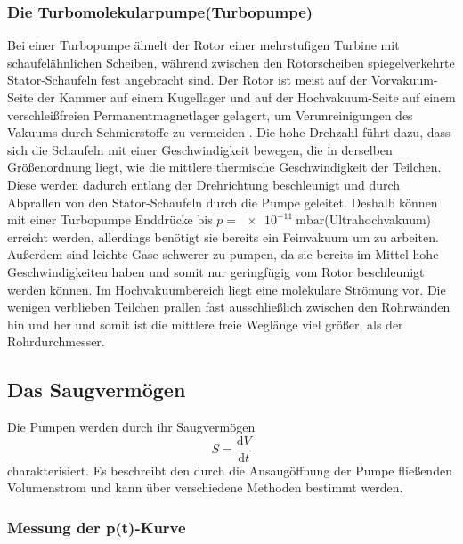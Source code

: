 \subsubsection{Die Turbomolekularpumpe(Turbopumpe)}

Bei einer Turbopumpe ähnelt der Rotor einer mehrstufigen Turbine mit schaufelähnlichen Scheiben, während zwischen den Rotorscheiben spiegelverkehrte Stator-Schaufeln fest angebracht sind.\newline
Der Rotor ist meist auf der Vorvakuum-Seite der Kammer auf einem Kugellager und auf der Hochvakuum-Seite auf einem verschleißfreien Permanentmagnetlager gelagert, um Verunreinigungen des Vakuums durch Schmierstoffe zu vermeiden \cite{Pfeiffer}. Die hohe Drehzahl führt dazu, dass sich die Schaufeln mit einer Geschwindigkeit bewegen, die in derselben Größenordnung liegt, wie die mittlere thermische Geschwindigkeit der Teilchen. Diese werden dadurch entlang der Drehrichtung beschleunigt und durch Abprallen von den Stator-Schaufeln durch die Pumpe geleitet.\newline
Deshalb können mit einer Turbopumpe Enddrücke bis $p=\SI{e-11}{\milli\bar}$(Ultrahochvakuum) erreicht werden, allerdings benötigt sie bereits ein Feinvakuum um zu arbeiten. Außerdem sind leichte Gase schwerer zu pumpen, da sie bereits im Mittel hohe Geschwindigkeiten haben und somit nur geringfügig vom Rotor beschleunigt werden können.\newline
Im Hochvakuumbereich liegt eine molekulare Strömung vor. Die wenigen verblieben Teilchen prallen fast ausschließlich zwischen den Rohrwänden hin und her und somit ist die mittlere freie Weglänge viel größer, als der Rohrdurchmesser\cite{Pfeiffer}.


\subsection{Das Saugvermögen}
Die Pumpen werden durch ihr Saugvermögen 
\[
S=\frac{\mathrm{d}V}{\mathrm{d}t}
\]
charakterisiert.
Es beschreibt den durch die Ansaugöffnung der Pumpe fließenden Volumenstrom und kann über verschiedene Methoden bestimmt werden.

\subsubsection{Messung der p(t)-Kurve}

